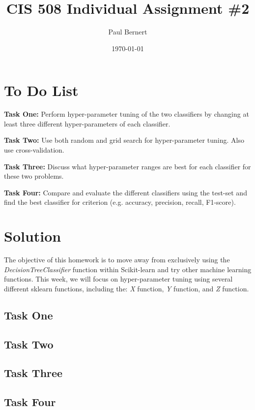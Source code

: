 \documentclass[notitlepage]{report}
\title{CIS 508 Individual Assignment \#2}
\author{Paul Bernert}
\date{\today}
\begin{document}
\maketitle
\thispagestyle{empty}

\section*{To Do List}

\qquad \textbf{Task One:} Perform hyper-parameter tuning of the two classifiers by changing at least three different hyper-parameters of each classifier.

\qquad \textbf{Task Two:} Use both random and grid search for hyper-parameter tuning. Also use cross-validation.

\qquad \textbf{Task Three:} Discuss what hyper-parameter ranges are best for each classifier for these two problems.

\qquad \textbf{Task Four:} Compare and evaluate the different classifiers using the test-set and find the best classifier for criterion (e.g. accuracy, precision, recall, F1-score). 

\section*{Solution}
The objective of this homework is to move away from exclusively using the \textit{DecisionTreeClassifier} function within Scikit-learn and try other machine learning functions. This week, we will focus on hyper-parameter tuning using several different sklearn functions, including the: \textit{X} function, \textit{Y} function, and \textit{Z} function. 

\subsection*{Task One}

\subsection*{Task Two}

\subsection*{Task Three}

\subsection*{Task Four}
\end{document}
